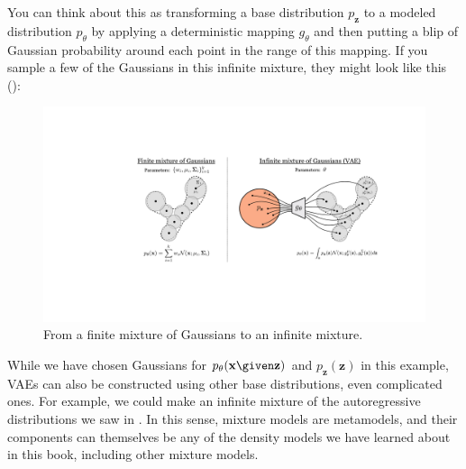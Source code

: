 You can think about this as transforming a base distribution $p_{\mathbf{z}}$ to a modeled distribution $p_{\theta}$ by applying a deterministic mapping $g_{\theta}$ and then putting a blip of Gaussian probability around each point in the range of this mapping. If you sample a few of the Gaussians in this infinite mixture, they might look like this (\fig{\ref{fig:generative_modeling_and_representation_learning:gmm_vs_vae}}):
\begin{figure}[h!]
    \centerline{
    \includegraphics[width=0.9\linewidth]{./figures/generative_modeling_and_representation_learning/gmm_vs_vae.pdf}
    }
    \caption{From a finite mixture of Gaussians to an infinite mixture.}
    \label{fig:generative_modeling_and_representation_learning:gmm_vs_vae}
\end{figure}

While we have chosen Gaussians for $p_{\theta}(\mathbf{x} \given \mathbf{z})$ and $p_{\mathbf{z}}(\mathbf{z})$ in this example, VAEs can also be constructed using other base distributions, even complicated ones. For example, we could make an infinite mixture of the autoregressive distributions we saw in \chap{\ref{chapter:generative_models}}. In this sense, mixture models are metamodels, and their components can themselves be any of the density models we have learned about in this book, including other mixture models.


